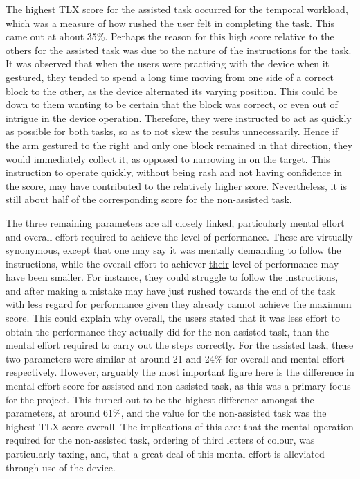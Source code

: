 \documentclass[11pt]{article}
\begin{document}
The highest TLX score for the assisted task occurred for the temporal workload, which was a measure of how rushed the user felt in completing the task. This came out at about 35\%. Perhaps the reason for this high score relative to the others for the assisted task was due to the nature of the instructions for the task. It was observed that when the users were practising with the device when it gestured, they tended to spend a long time moving from one side of a correct block to the other, as the device alternated its varying position. This could be down to them wanting to be certain that the block was correct, or even out of intrigue in the device operation. Therefore, they were instructed to act as quickly as possible for both tasks, so as to not skew the results unnecessarily. Hence if the arm gestured to the right and only one block remained in that direction, they would immediately collect it, as opposed to narrowing in on the target. This instruction to operate quickly, without being rash and not having confidence in the score, may have contributed to the relatively higher score. Nevertheless, it is still about half of the corresponding score for the non-assisted task.

The three remaining parameters are all closely linked, particularly mental effort and overall effort required to achieve the level of performance. These are virtually synonymous, except that one may say it was mentally demanding to follow the instructions, while the overall effort to achiever \underline{their} level of performance may have been smaller. For instance, they could struggle to follow the instructions, and after making a mistake may have just rushed towards the end of the task with less regard for performance given they already cannot achieve the maximum score. This could explain why overall, the users stated that it was less effort to obtain the performance they actually did for the non-assisted task, than the mental effort required to carry out the steps correctly. For the assisted task, these two parameters were similar at around 21 and 24\% for overall and mental effort respectively. However, arguably the most important figure here is the difference in mental effort score for assisted and non-assisted task, as this was a primary focus for the project. This turned out to be the highest difference amongst the parameters, at around 61\%, and the value for the non-assisted task was the highest TLX score overall. The implications of this are: that the mental operation required for the non-assisted task, ordering of third letters of colour, was particularly taxing, and, that a great deal of this mental effort is alleviated through use of the device.
\end{document}

